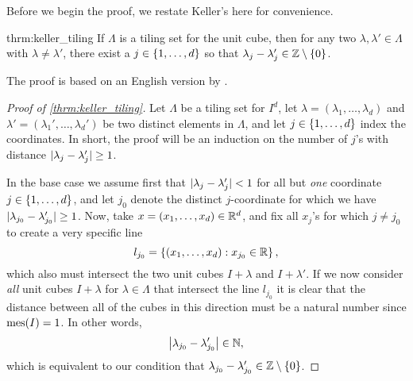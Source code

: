 \documentclass[../thesis.tex]{subfiles}
\begin{document}
Before we begin the proof, we restate Keller's  here for convenience. 
\begin{reptheorem}{thrm:keller_tiling}
    If $\Lambda$ is a tiling set for the unit cube, then for any two $\lambda, \lambda' \in \Lambda$ with $\lambda\neq\lambda'$, there exist a $j\in \{1,\dots,d\}$ so that $\lambda_j-\lambda_j' \in \mathbb{Z}\setminus\{0\}$.
\end{reptheorem}

The proof is based on an English version by \cite{iosevichSpectralTilingProperties1998}.

\begin{proof}[Proof of \cref{thrm:keller_tiling}]
    Let $\Lambda$ be a tiling set for $I^d$, let $\lambda = (\lambda_1,\dots,\lambda_d)$ and $\lambda' = (\lambda_1',\dots,\lambda_d')$ be two distinct elements in $\Lambda$, and let $j\in\{1,\dots, d\}$ index the coordinates. In short, the proof will be an induction on the number of $j$'s with distance $ |\lambda_j-\lambda_j'|\geq 1$.

    In the base case we assume first that $|\lambda_j-\lambda_j' |< 1 $ for all but \emph{one} coordinate $j\in \{1,\dots,d\}$, and let $j_0$ denote the distinct $j$-coordinate for which we have $|\lambda_{j_0}-\lambda_{j_0}'| \geq 1$. Now, take $x=(x_1,\dots,x_d)\in \mathbb{R}^d$, and fix all $x_j$'s for which $j\neq j_0$ to create a very specific line
    \begin{equation*}
        l_{j_0} = \left\{\left(x_1,\dots,x_d\right) : x_{j_0} \in \mathbb{R} \right\},
    \end{equation*}
    which also must intersect the two unit cubes $I+\lambda$ and $I+\lambda'$. If we now consider \emph{all} unit cubes $I+\lambda$ for $\lambda \in \Lambda$ that intersect the line $l_{j_0}$ it is clear that the distance between all of the cubes in this direction must be a natural number since $\operatorname{mes}(I)=1$. In other words,
    \begin{equation}\label{eq:special_j0}
        \left|\lambda_{j_0}-\lambda_{j_0}'\right| \in \mathbb{N},
    \end{equation}
    which is equivalent to our condition that $\lambda_{j_0}-\lambda_{j_0}' \in \mathbb{Z}\setminus\{0\}$.


\end{proof}
\end{document}
